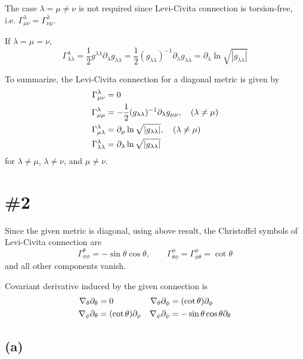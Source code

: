 \documentclass[a4paper,11pt]{article}
\begin{document}
The case $\lambda = \mu \ne \nu$ is not required since Levi-Civita connection is torsion-free, i.e. $\Gamma^{\lambda}_{\mu\nu} = \Gamma^{\lambda}_{\nu\mu}$.

If $\lambda = \mu = \nu$,
\begin{equation}
    \Gamma^{\lambda}_{\lambda\lambda} = \frac{1}{2} g^{\lambda\lambda} \partial_\lambda g_{\lambda\lambda} = \frac{1}{2} (g_{\lambda\lambda})^{-1} \partial_\lambda g_{\lambda\lambda} = \partial_\lambda \ln \sqrt{|g_{\lambda\lambda}|}
\end{equation}

To summarize, the Levi-Civita connection for a diagonal metric is given by
\begin{align}
    \Gamma^{\lambda}_{\mu\nu} &= 0\notag\\
    \Gamma^{\lambda}_{\mu\mu} &= -\frac{1}{2} (g_{\lambda\lambda})^{-1} \partial_\lambda g_{\mu\mu}, \quad (\lambda \ne \mu)\notag\\
    \Gamma^{\lambda}_{\mu\lambda} &= \partial_\mu \ln \sqrt{|g_{\lambda\lambda}|}, \quad (\lambda \ne \mu)\notag\\
    \Gamma^{\lambda}_{\lambda\lambda} &= \partial_\lambda \ln \sqrt{|g_{\lambda\lambda}|}\label{eqn:diag_met_chs}
\end{align}
for $\lambda\ne\mu$, $\lambda\ne\nu$, and $\mu\ne\nu$.



\section{\#2}

Since the given metric is diagonal, using above result, the Christoffel symbols of Levi-Civita connection are
\begin{equation}
    \Gamma^{\theta}_{\phi\phi} = -\sin\theta \cos\theta, \qquad \Gamma^{\phi}_{\theta\phi} = \Gamma^{\phi}_{\phi\theta} = \cot \theta
\end{equation}
and all other components vanish.


Covariant derivative induced by the given connection is
\begin{align}
    \nabla_\theta\partial_\theta &= 0 & \nabla_\theta\partial_\phi &= (\cot\theta)\partial_\phi\notag\\
    \nabla_\phi\partial_\theta &= (\cot\theta)\partial_\phi & \nabla_\phi\partial_\phi &= -\sin\theta\cos\theta\partial_\theta\label{eqn:cov_der_2}
\end{align}


\subsection{(a)}
\end{document}
